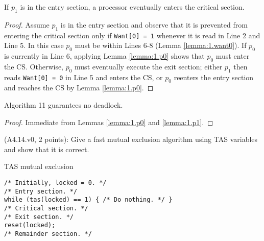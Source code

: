 \begin{lemma} \label{lemma:1.p1}
If $p_1$ is in the entry section, a processor eventually enters the critical section.
\end{lemma}

\begin{proof}
Assume $p_1$ is in the entry section and observe that it
is prevented from entering the critical section only if \lstinline|Want[0] = 1|
whenever it is read in Line 2 and Line 5. In this case $p_0$ must be within Lines
6-8 (Lemma \ref{lemma:1.want0}). If $p_0$ is currently in Line 6, applying Lemma
\ref{lemma:1.p0} shows that $p_0$ must enter the CS. Otherwise, $p_0$ must
eventually execute the exit section; either $p_1$ then reads \lstinline|Want[0] = 0|
in Line 5 and enters the CS, or $p_0$ reenters the entry section and reaches the
CS by Lemma \ref{lemma:1.p0}.

\end{proof}


\begin{theorem}
Algorithm 11 guarantees no deadlock.
\end{theorem}

\begin{proof}
Immediate from Lemmas \ref{lemma:1.p0} and \ref{lemma:1.p1}.
\end{proof}


\begin{Exc}{(A4.14.v0, 2 points):}
Give a fast mutual exclusion algorithm using TAS variables and
show that it is correct.
\end{Exc}

\begin{algorithm}
\caption{TAS mutual exclusion} \label{alg:tas}
\begin{lstlisting}
/* Initially, locked = 0. */
/* Entry section. */
while (tas(locked) == 1) { /* Do nothing. */ }
/* Critical section. */
/* Exit section. */
reset(locked);
/* Remainder section. */
\end{lstlisting}
\end{algorithm}



\newcommand{\last}[1]{#1.\mathit{last}}
\newcommand{\first}[1]{#1.\mathit{first}}
\newcommand{\VV}[1]{\langle #1 \rangle}
\newcommand{\pos}{\mathit{pos}}
\newcommand{\queue}{\mathit{queue}}
\newcommand{\RMW}{\mathit{RMW}}

